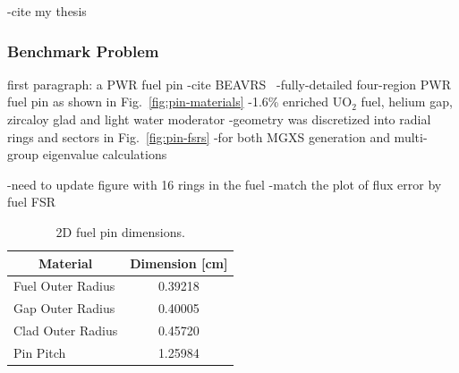 -cite my thesis~\cite{boyd2016thesis}


\subsubsection{Benchmark Problem}
\label{subsubsec:benchmark-case2}

first paragraph: a PWR fuel pin
-cite BEAVRS~\cite{horelik2013beavrs}
-fully-detailed four-region PWR fuel pin as shown in Fig.~\ref{fig:pin-materials}
  -1.6\% enriched UO$_2$ fuel, helium gap, zircaloy glad and light water moderator
-geometry was discretized into radial rings and sectors in Fig.~\ref{fig:pin-fsrs}
  -for both MGXS generation and multi-group eigenvalue calculations

-need to update figure with 16 rings in the fuel
  -match the plot of flux error by fuel FSR

\begin{table}[H]
  \centering
  \caption{2D fuel pin dimensions.}
  \label{table:pin-dimensions} 
  \begin{tabular}{l c}
  \toprule
  \multicolumn{1}{c}{\bf Material} &
  {\bf Dimension [cm]} \\
  \midrule
  Fuel Outer Radius & 0.39218 \\
  Gap Outer Radius &  0.40005 \\
  Clad Outer Radius & 0.45720 \\
  Pin Pitch &         1.25984 \\
  \bottomrule
\end{tabular}
\end{table}

